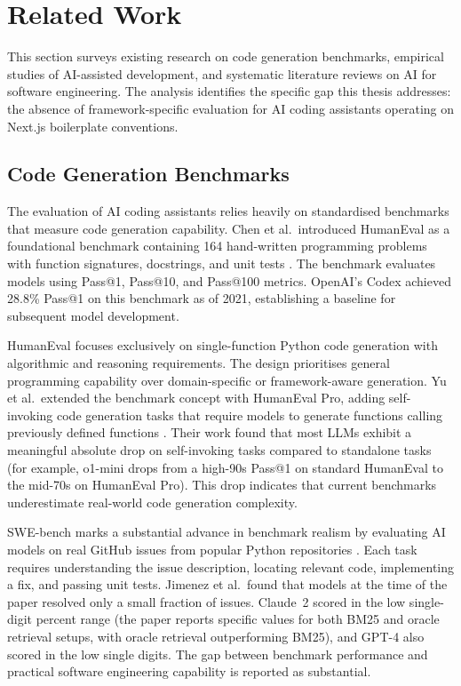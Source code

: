 \documentclass[12pt,a4paper]{report}
\begin{document}
\chapter{Related Work}
\label{sec:relatedwork}

This section surveys existing research on code generation benchmarks, empirical studies of AI-assisted development, and systematic literature reviews on AI for software engineering. The analysis identifies the specific gap this thesis addresses: the absence of framework-specific evaluation for AI coding assistants operating on Next.js boilerplate conventions.

\section{Code Generation Benchmarks}

The evaluation of AI coding assistants relies heavily on standardised benchmarks that measure code generation capability. Chen et al.\ introduced HumanEval as a foundational benchmark containing 164 hand-written programming problems with function signatures, docstrings, and unit tests \parencite{chen2021evaluating}. The benchmark evaluates models using Pass@1, Pass@10, and Pass@100 metrics. OpenAI's Codex achieved 28.8\% Pass@1 on this benchmark as of 2021, establishing a baseline for subsequent model development.

HumanEval focuses exclusively on single-function Python code generation with algorithmic and reasoning requirements. The design prioritises general programming capability over domain-specific or framework-aware generation. Yu et al.\ extended the benchmark concept with HumanEval Pro, adding self-invoking code generation tasks that require models to generate functions calling previously defined functions \parencite{yu2025humanevalpro}. Their work found that most LLMs exhibit a meaningful absolute drop on self-invoking tasks compared to standalone tasks (for example, o1-mini drops from a high-90s Pass@1 on standard HumanEval to the mid-70s on HumanEval Pro). This drop indicates that current benchmarks underestimate real-world code generation complexity.

SWE-bench marks a substantial advance in benchmark realism by evaluating AI models on real GitHub issues from popular Python repositories \parencite{jimenez2024swebench}. Each task requires understanding the issue description, locating relevant code, implementing a fix, and passing unit tests. Jimenez et al.\ found that models at the time of the paper resolved only a small fraction of issues. Claude~2 scored in the low single-digit percent range (the paper reports specific values for both BM25 and oracle retrieval setups, with oracle retrieval outperforming BM25), and GPT-4 also scored in the low single digits. The gap between benchmark performance and practical software engineering capability is reported as substantial.
\end{document}
